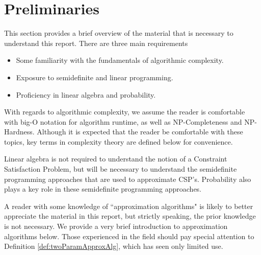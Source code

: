 \section{Preliminaries}
This section provides a brief overview of the material that is necessary to understand this report. There are three main requirements
\begin{itemize}
\item Some familiarity with the fundamentals of algorithmic complexity.
\item Exposure to semidefinite and linear programming.
\item Proficiency in linear algebra and probability.
\end{itemize}

With regards to algorithmic complexity, we assume the reader is comfortable with big-O notation for algorithm runtime, as well as NP-Completeness and NP-Hardness. 
Although it is expected that the reader be comfortable with these topics, key terms in complexity theory are defined below for convenience.

Linear algebra is not required to understand the notion of a Constraint Satisfaction Problem, but will be necessary to understand the semidefinite programming approaches that are used to approximate CSP's. 
Probability also plays a key role in these semidefinite programming approaches.

A reader with some knowledge of ``approximation algorithms" is likely to better appreciate the material in this report, but strictly speaking, the prior knowledge is not necessary. 
We provide a very brief introduction to approximation algorithms below. 
Those experienced in the field should pay special attention to Definition \ref{def:twoParamApproxAlg}, which has seen only limited use.


